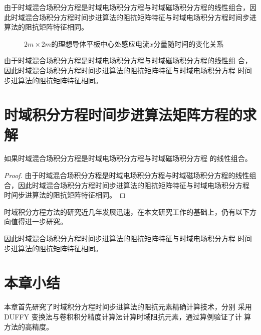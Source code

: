 \documentclass{standalone}
\begin{document}
由于时域混合场积分方程是时域电场积分方程与时域磁场积分方程的线性组合，因此时域混合场积分方程时间步进算法的阻抗矩阵特征与时域电场积分方程时间步进算法的阻抗矩阵特征相同。

\begin{figure}[h]
	\caption{$2m\times 2m$的理想导体平板中心处感应电流$x$分量随时间的变化关系}
	\label{fig2}
\end{figure}


由于时域混合场积分方程是时域电场积分方程与时域磁场积分方程的线性组
合，因此时域混合场积分方程时间步进算法的阻抗矩阵特征与时域电场积分方程
时间步进算法的阻抗矩阵特征相同。
\section{时域积分方程时间步进算法矩阵方程的求解}

\begin{theorem}
	如果时域混合场积分方程是时域电场积分方程与时域磁场积分方程
	的线性组合。
\end{theorem}
\begin{proof}
	由于时域混合场积分方程是时域电场积分方程与时域磁场积分方程的线性组
	合，因此时域混合场积分方程时间步进算法的阻抗矩阵特征与时域电场积分方程
	时间步进算法的阻抗矩阵特征相同。
\end{proof}
\begin{corollary}
	时域积分方程方法的研究近几年发展迅速，在本文研究工作的基础上，仍有以下方向值得进一步研究。
\end{corollary}
\begin{lemma}
	因此时域混合场积分方程时间步进算法的阻抗矩阵特征与时域电场积分方程
	时间步进算法的阻抗矩阵特征相同。
\end{lemma}

\section{本章小结}
本章首先研究了时域积分方程时间步进算法的阻抗元素精确计算技术，分别
采用DUFFY 变换法与卷积积分精度计算法计算时域阻抗元素，通过算例验证了计
算方法的高精度。
\end{document}
